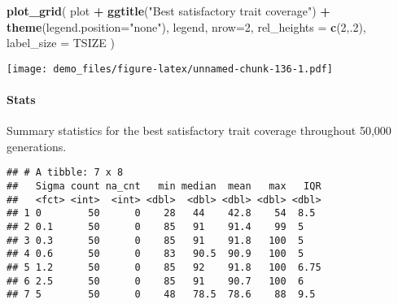 \documentclass[]{book}
\newenvironment{Shaded}{\begin{snugshade}}{\end{snugshade}}
\newcommand{\DataTypeTok}[1]{\textcolor[rgb]{0.13,0.29,0.53}{#1}}
\newcommand{\DecValTok}[1]{\textcolor[rgb]{0.00,0.00,0.81}{#1}}
\newcommand{\KeywordTok}[1]{\textcolor[rgb]{0.13,0.29,0.53}{\textbf{#1}}}
\newcommand{\NormalTok}[1]{#1}
\newcommand{\OperatorTok}[1]{\textcolor[rgb]{0.81,0.36,0.00}{\textbf{#1}}}
\newcommand{\OtherTok}[1]{\textcolor[rgb]{0.56,0.35,0.01}{#1}}
\newcommand{\StringTok}[1]{\textcolor[rgb]{0.31,0.60,0.02}{#1}}
\let\oldparagraph\paragraph
\renewcommand{\paragraph}[1]{\oldparagraph{#1}\mbox{}}
\begin{document}
\begin{Shaded}
\begin{Highlighting}[]
\KeywordTok{plot_grid}\NormalTok{(}
\NormalTok{  plot }\OperatorTok{+}
\StringTok{    }\KeywordTok{ggtitle}\NormalTok{(}\StringTok{"Best satisfactory trait coverage"}\NormalTok{) }\OperatorTok{+}
\StringTok{    }\KeywordTok{theme}\NormalTok{(}\DataTypeTok{legend.position=}\StringTok{"none"}\NormalTok{),}
\NormalTok{  legend,}
  \DataTypeTok{nrow=}\DecValTok{2}\NormalTok{,}
  \DataTypeTok{rel_heights =} \KeywordTok{c}\NormalTok{(}\DecValTok{2}\NormalTok{,.}\DecValTok{2}\NormalTok{),}
  \DataTypeTok{label_size =}\NormalTok{ TSIZE}
\NormalTok{)}
\end{Highlighting}
\end{Shaded}

\texttt{[image: demo\_files/figure-latex/unnamed-chunk-136-1.pdf]}

\hypertarget{stats-67}{%
\paragraph{Stats}\label{stats-67}}

Summary statistics for the best satisfactory trait coverage throughout 50,000 generations.

\begin{Shaded}
\end{Shaded}

\begin{verbatim}
## # A tibble: 7 x 8
##   Sigma count na_cnt   min median  mean   max   IQR
##   <fct> <int>  <int> <dbl>  <dbl> <dbl> <dbl> <dbl>
## 1 0        50      0    28   44    42.8    54  8.5 
## 2 0.1      50      0    85   91    91.4    99  5   
## 3 0.3      50      0    85   91    91.8   100  5   
## 4 0.6      50      0    83   90.5  90.9   100  5   
## 5 1.2      50      0    85   92    91.8   100  6.75
## 6 2.5      50      0    85   91    90.7   100  6   
## 7 5        50      0    48   78.5  78.6    88  9.5
\end{verbatim}
\end{document}
